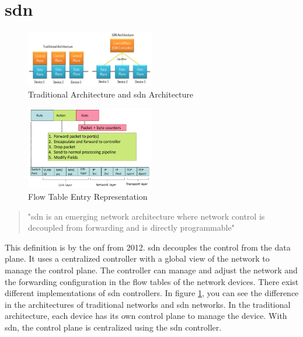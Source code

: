 \documentclass[conference]{IEEEtran}
\begin{document}
	\section{\ac{sdn}}
	\label{sec:sdn}

	\begin{figure}
		\centering
		\includegraphics[width=0.5\textwidth]{figures/architecture-compare.png}
		\caption{Traditional Architecture and \ac{sdn} Architecture \cite{Jefia2018-pj}}
		\label{fig:architecture-compare}
	\end{figure}

	\begin{figure}
		\centering
		\includegraphics[width=0.5\textwidth]{figures/flow-table.png}
		\caption{Flow Table Entry Representation \cite{sdn-overview}}
		\label{fig:flow-table}
	\end{figure}

	\begin{quote}
		"\acf{sdn} is an emerging network architecture
		where network control is decoupled from forwarding and is directly programmable" \cite{sdn-onf} 
	\end{quote}

	This definition is by the \ac{onf} from 2012. \acf{sdn} decouples the control from the data plane. It uses a centralized controller with a global view of the network to manage the control plane. The controller can manage and adjust the network and the forwarding configuration in the flow tables of the network devices. There exist different implementations of \ac{sdn} controllers. In figure \ref{fig:architecture-compare}, you can see the difference in the architectures of traditional networks and \ac{sdn} networks. In the traditional architecture, each device has its own control plane to manage the device. With \ac{sdn}, the control plane is centralized using the \ac{sdn} controller.
\end{document}
